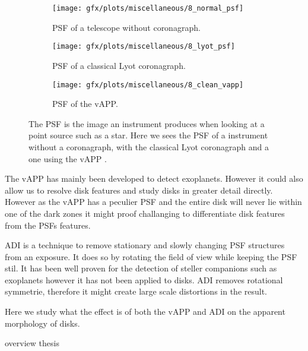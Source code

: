 \begin{figure}[h!]
      \begin{subfigure}[t]{0.5\textwidth}
        \texttt{[image: gfx/plots/miscellaneous/8\_normal\_psf]}
        \caption{\ac{PSF} of a telescope without coronagraph.}
        \label{fig:classic_psf}
      \end{subfigure}
      \begin{subfigure}[t]{0.5 \textwidth}
        \texttt{[image: gfx/plots/miscellaneous/8\_lyot\_psf]}
        \label{fig:lyot}
        \caption{\ac{PSF} of a classical Lyot coronagraph.}
      \end{subfigure}%
      
      \begin{subfigure}[]{0.5\textwidth}
        \texttt{[image: gfx/plots/miscellaneous/8\_clean\_vapp]}
        \caption{\ac{PSF} of the \ac{vAPP}.}
      \end{subfigure}
      
  \caption{The \ac{PSF} is the image an instrument produces when looking at a point source such as a star. Here we sees the \ac{PSF} of a instrument without a coronagraph, with the classical Lyot coronagraph and a one using the \ac{vAPP} .}
  \label{fig:vapp_vs_lyot}
\end{figure}

The \ac{vAPP} has mainly been developed to detect exoplanets. However it could also allow us to resolve disk features and study disks in greater detail directly. However as the \ac{vAPP} has a peculier \ac{PSF} and the entire disk will never lie within one of the dark zones it might proof challanging to differentiate disk features from the \acp{PSF} features. 

\ac{ADI} is a technique to remove stationary and slowly changing \ac{PSF} structures from an exposure. It does so by rotating the field of view while keeping the \ac{PSF} stil. It has been well proven for the detection of steller companions such as exoplanets however it has not been applied to disks. \ac{ADI} removes rotational symmetrie, therefore it might create large scale distortions in the result.

Here we study what the effect is of both the \ac{vAPP} and \ac{ADI} on the apparent morphology of disks.

overview thesis

